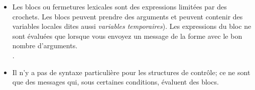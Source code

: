 \documentclass[a4paper,10pt,twoside]{book}
\begin{document}
\begin{itemize}
\item	Les blocs ou fermetures lexicales sont des expressions limit\'{e}es par des crochets.
		Les blocs peuvent prendre des arguments et peuvent contenir
        des variables locales dites aussi \emph{variables temporaires}).
		Les expressions du bloc ne sont \'{e}valu\'{e}es que lorsque
        vous envoyez un message de la forme  avec le bon nombre d'arguments.\\
		.

\item	Il n'y a pas de syntaxe particuli\`{e}re pour les structures
  de contr\^{o}le; ce ne sont que des messages qui, sous certaines conditions, \'{e}valuent des blocs.\\

\end{itemize}

\ifx\wholebook\relax\else
\end{document}
